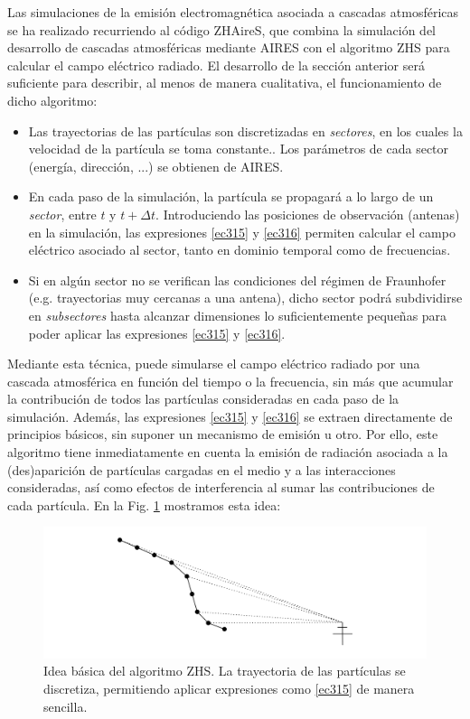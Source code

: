 \documentclass[12 pt, a4paper]{article} %
\numberwithin{equation}{section}
\numberwithin{figure}{section}
\begin{document}
Las simulaciones de la emisión electromagnética asociada a cascadas atmosféricas se ha realizado recurriendo al código ZHAireS, que combina la simulación del desarrollo de cascadas atmosféricas mediante AIRES con el algoritmo ZHS para calcular el campo eléctrico radiado. El desarrollo de la sección anterior será suficiente para describir, al menos de manera cualitativa, el funcionamiento de dicho algoritmo:
	\begin{itemize}
		\item Las trayectorias de las partículas son discretizadas en \textit{sectores}, en los cuales la velocidad de la partícula se toma constante.. Los parámetros de cada sector (energía, dirección, ...) se obtienen de AIRES.
		\item En cada paso de la simulación, la partícula se propagará a lo largo de un \textit{sector}, entre $t$ y $t+\Delta t$. Introduciendo las posiciones de observación (antenas) en la simulación, las expresiones \eqref{ec315} y \eqref{ec316} permiten calcular el campo eléctrico asociado al sector, tanto en dominio temporal como de frecuencias.
		\item Si en algún sector no se verifican las condiciones del régimen de Fraunhofer (e.g. trayectorias muy cercanas a una antena), dicho sector podrá subdividirse en \textit{subsectores} hasta alcanzar dimensiones lo suficientemente pequeñas para poder aplicar las expresiones \eqref{ec315} y \eqref{ec316}.

		
	\end{itemize}
Mediante esta técnica, puede simularse el campo eléctrico radiado por una cascada atmosférica en función del tiempo o la frecuencia, sin más que acumular la contribución de todos las partículas consideradas en cada paso de la simulación. Además, las expresiones \eqref{ec315} y \eqref{ec316} se extraen directamente de principios básicos, sin suponer un mecanismo de emisión u otro. Por ello, este algoritmo tiene inmediatamente en cuenta la emisión de radiación asociada a la (des)aparición de partículas cargadas en el medio y a las interacciones consideradas, así como efectos de interferencia al sumar las contribuciones de cada partícula. En la Fig. \ref{ZHSsketch} mostramos esta idea:  
	\begin{figure}[H]
		\centering
		\includegraphics[width=.8\linewidth]{figures/ZHSsketch}
		\caption{Idea básica del algoritmo ZHS. La trayectoria de las partículas se discretiza, permitiendo aplicar expresiones como \eqref{ec315} de manera sencilla.}
		\label{ZHSsketch}
	\end{figure}
 
\end{document}
